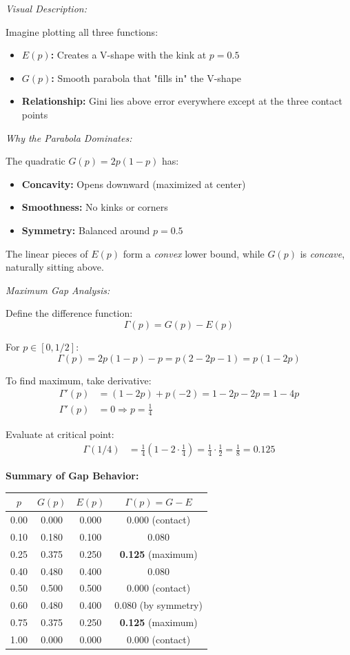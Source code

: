\documentclass[12pt]{article}
\begin{document}
\begin{explanation}
\textit{Visual Description:}

Imagine plotting all three functions:
\begin{itemize}
    \item \textbf{$E(p)$:} Creates a V-shape with the kink at $p=0.5$
    \item \textbf{$G(p)$:} Smooth parabola that "fills in" the V-shape
    \item \textbf{Relationship:} Gini lies above error everywhere except at the three contact points
\end{itemize}

\textit{Why the Parabola Dominates:}

The quadratic $G(p) = 2p(1-p)$ has:
\begin{itemize}
    \item \textbf{Concavity:} Opens downward (maximized at center)
    \item \textbf{Smoothness:} No kinks or corners
    \item \textbf{Symmetry:} Balanced around $p=0.5$
\end{itemize}

The linear pieces of $E(p)$ form a \textit{convex} lower bound, while $G(p)$ is \textit{concave}, naturally sitting above.

\textit{Maximum Gap Analysis:}

Define the difference function:
\[
\Gamma(p) = G(p) - E(p)
\]

For $p \in [0, 1/2]$:
\[
\Gamma(p) = 2p(1-p) - p = p(2 - 2p - 1) = p(1 - 2p)
\]

To find maximum, take derivative:
\begin{align*}
\Gamma'(p) &= (1 - 2p) + p(-2) = 1 - 2p - 2p = 1 - 4p \\
\Gamma'(p) &= 0 \Rightarrow p = \frac{1}{4}
\end{align*}

Evaluate at critical point:
\begin{align*}
\Gamma(1/4) &= \frac{1}{4}\left(1 - 2 \cdot \frac{1}{4}\right) = \frac{1}{4} \cdot \frac{1}{2} = \frac{1}{8} = 0.125
\end{align*}

\textbf{Summary of Gap Behavior:}
\begin{center}
\begin{tabular}{c|c|c|c}
$p$ & $G(p)$ & $E(p)$ & $\Gamma(p) = G - E$ \\
\hline
0.00 & 0.000 & 0.000 & 0.000 (contact) \\
0.10 & 0.180 & 0.100 & 0.080 \\
0.25 & 0.375 & 0.250 & \textbf{0.125} (maximum) \\
0.40 & 0.480 & 0.400 & 0.080 \\
0.50 & 0.500 & 0.500 & 0.000 (contact) \\
0.60 & 0.480 & 0.400 & 0.080 (by symmetry) \\
0.75 & 0.375 & 0.250 & \textbf{0.125} (maximum) \\
1.00 & 0.000 & 0.000 & 0.000 (contact) \\
\end{tabular}
\end{center}


\end{explanation}
\end{document}

